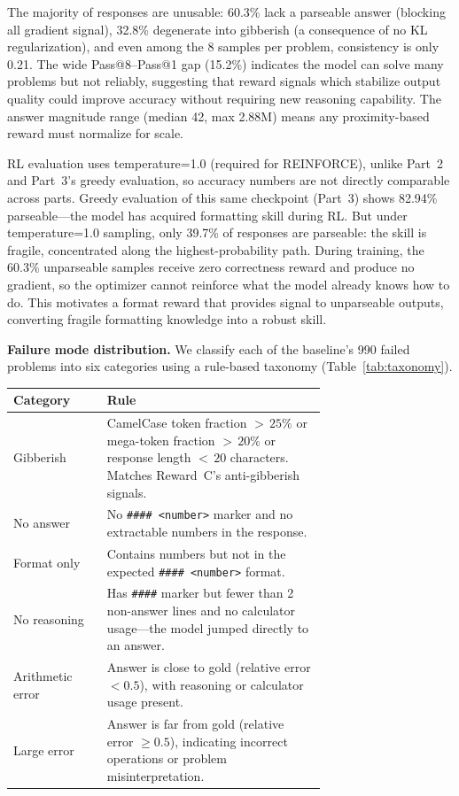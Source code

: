 The majority of responses are unusable: 60.3\% lack a parseable answer (blocking all gradient signal), 32.8\% degenerate into gibberish (a consequence of no KL regularization), and even among the 8 samples per problem, consistency is only 0.21.
The wide Pass@8--Pass@1 gap (15.2\%) indicates the model can solve many problems but not reliably, suggesting that reward signals which stabilize output quality could improve accuracy without requiring new reasoning capability.
The answer magnitude range (median 42, max 2.88M) means any proximity-based reward must normalize for scale.

RL evaluation uses temperature=1.0 (required for REINFORCE), unlike Part~2 and Part~3's greedy evaluation, so accuracy numbers are not directly comparable across parts.
Greedy evaluation of this same checkpoint (Part~3) shows 82.94\% parseable---the model has acquired formatting skill during RL.
But under temperature=1.0 sampling, only 39.7\% of responses are parseable: the skill is fragile, concentrated along the highest-probability path.
During training, the 60.3\% unparseable samples receive zero correctness reward and produce no gradient, so the optimizer cannot reinforce what the model already knows how to do.
This motivates a format reward that provides signal to unparseable outputs, converting fragile formatting knowledge into a robust skill.

\textbf{Failure mode distribution.}
We classify each of the baseline's 990 failed problems into six categories using a rule-based taxonomy (Table~\ref{tab:taxonomy}).

\vspace{1em}
\noindent\begin{minipage}{\linewidth}
\centering
\begin{tabular*}{\linewidth}{@{\extracolsep{\fill}}l p{0.7\linewidth}}
\toprule
\textbf{Category} & \textbf{Rule} \\
\midrule
Gibberish       & CamelCase token fraction ${>}\,25\%$ or mega-token fraction ${>}\,20\%$ or response length ${<}\,20$ characters. Matches Reward~C's anti-gibberish signals. \\
No answer       & No \texttt{\#\#\#\# <number>} marker and no extractable numbers in the response. \\
Format only     & Contains numbers but not in the expected \texttt{\#\#\#\# <number>} format. \\
No reasoning    & Has \texttt{\#\#\#\#} marker but fewer than 2 non-answer lines and no calculator usage---the model jumped directly to an answer. \\
Arithmetic error & Answer is close to gold (relative error $< 0.5$), with reasoning or calculator usage present. \\
Large error     & Answer is far from gold (relative error $\geq 0.5$), indicating incorrect operations or problem misinterpretation. \\
\bottomrule
\end{tabular*}
\label{tab:taxonomy}
\end{minipage}
\vspace{1em}

